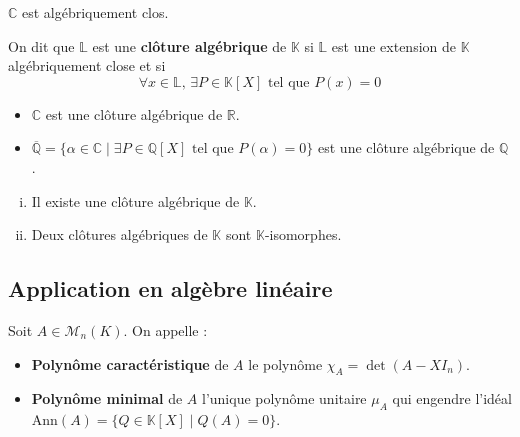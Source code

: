 	\begin{theorem}
		$\mathbb{C}$ est algébriquement clos.
	\end{theorem}

	\begin{definition}
		On dit que $\mathbb{L}$ est une \textbf{clôture algébrique} de $\mathbb{K}$ si $\mathbb{L}$ est une extension de $\mathbb{K}$ algébriquement close et si
		\[ \forall x \in \mathbb{L}, \, \exists P \in \mathbb{K}[X] \text{ tel que } P(x) = 0 \]
	\end{definition}

	\begin{example}
		\begin{itemize}
			\item $\mathbb{C}$ est une clôture algébrique de $\mathbb{R}$.
			\item $\overline{\mathbb{Q}} = \{ \alpha \in \mathbb{C} \mid \exists P \in \mathbb{Q}[X] \text{ tel que } P(\alpha) = 0 \}$ est une clôture algébrique de $\mathbb{Q}$.
		\end{itemize}
	\end{example}

	\begin{theorem}[Steinitz]
		\begin{enumerate}[(i)]
			\item Il existe une clôture algébrique de $\mathbb{K}$.
			\item Deux clôtures algébriques de $\mathbb{K}$ sont $\mathbb{K}$-isomorphes.
		\end{enumerate}
	\end{theorem}

	\subsection{Application en algèbre linéaire}


	\begin{definition}
		Soit $A \in \mathcal{M}_n(K)$. On appelle :
		\begin{itemize}
			\item \textbf{Polynôme caractéristique} de $A$ le polynôme $\chi_A = \det(A - XI_n)$.
			\item \textbf{Polynôme minimal} de $A$ l'unique polynôme unitaire $\mu_A$ qui engendre l'idéal $\mathrm{Ann}(A) = \{ Q \in \mathbb{K}[X] \mid Q(A) = 0 \}$.
		\end{itemize}
	\end{definition}

